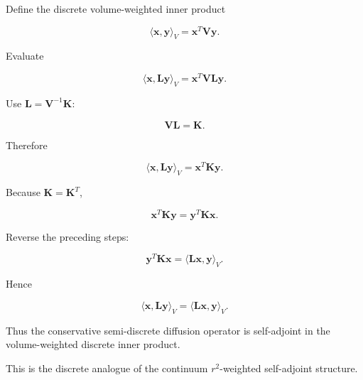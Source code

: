 \documentclass[11pt,a4paper]{article}
\begin{document}
Define the discrete volume-weighted inner product

\begin{equation}
\boxed{
\langle\mathbf x,\mathbf y\rangle_V
=
\mathbf x^T\mathbf V\mathbf y.
}
\tag{TRISO-FV-261}
\label{eq:triso-fv-261}
\end{equation}

Evaluate

\begin{equation}
\langle\mathbf x,\mathbf L\mathbf y\rangle_V
=
\mathbf x^T\mathbf V\mathbf L\mathbf y.
\tag{TRISO-FV-262}
\label{eq:triso-fv-262}
\end{equation}

Use $\mathbf L=\mathbf V^{-1}\mathbf K$:

\begin{equation}
\mathbf V\mathbf L
=
\mathbf K.
\tag{TRISO-FV-263}
\label{eq:triso-fv-263}
\end{equation}

Therefore

\begin{equation}
\langle\mathbf x,\mathbf L\mathbf y\rangle_V
=
\mathbf x^T\mathbf K\mathbf y.
\tag{TRISO-FV-264}
\label{eq:triso-fv-264}
\end{equation}

Because $\mathbf K=\mathbf K^T$,

\begin{equation}
\mathbf x^T\mathbf K\mathbf y
=
\mathbf y^T\mathbf K\mathbf x.
\tag{TRISO-FV-265}
\label{eq:triso-fv-265}
\end{equation}

Reverse the preceding steps:

\begin{equation}
\mathbf y^T\mathbf K\mathbf x
=
\langle\mathbf L\mathbf x,\mathbf y\rangle_V.
\tag{TRISO-FV-266}
\label{eq:triso-fv-266}
\end{equation}

Hence

\begin{equation}
\boxed{
\langle\mathbf x,\mathbf L\mathbf y\rangle_V
=
\langle\mathbf L\mathbf x,\mathbf y\rangle_V.
}
\tag{TRISO-FV-267}
\label{eq:triso-fv-267}
\end{equation}

Thus the conservative semi-discrete diffusion operator is self-adjoint in the volume-weighted discrete inner product.

This is the discrete analogue of the continuum $r^2$-weighted self-adjoint structure.
\end{document}
